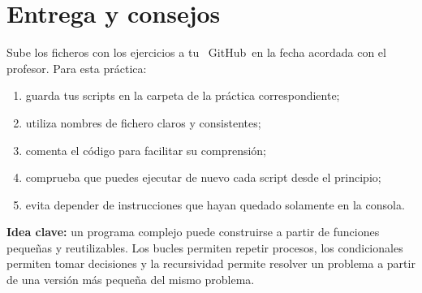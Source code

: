 \documentclass[11pt,a4paper]{article}
\newcommand{\GitHub}{\faIcon{github}~\!GitHub}
\theoremstyle{exercise}
\begin{document}
\section{Entrega y consejos}


Sube los ficheros con los ejercicios a tu \GitHub\ en la fecha acordada con el profesor. Para esta práctica:
\begin{enumerate}
	\item guarda tus scripts en la carpeta de la práctica correspondiente;
	\item utiliza nombres de fichero claros y consistentes;
	\item comenta el código para facilitar su comprensión;
	\item comprueba que puedes ejecutar de nuevo cada script desde el principio;
	\item evita depender de instrucciones que hayan quedado solamente en la consola.
\end{enumerate}


\begin{center} 
	\textbf{\color{azuluc}Idea clave:} un programa complejo puede construirse a partir de funciones pequeñas y reutilizables. Los bucles permiten repetir procesos, los condicionales permiten tomar decisiones y la recursividad permite resolver un problema a partir de una versión más pequeña del mismo problema. 
\end{center}
\end{document}
